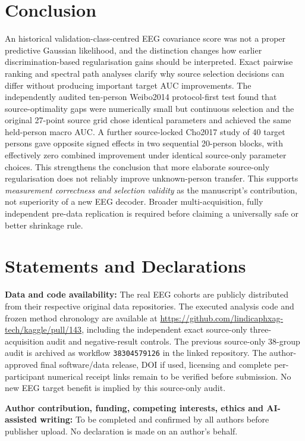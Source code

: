 \documentclass[12pt,a4paper]{article}
\begin{document}
\section{Conclusion}
An historical validation-class-centred EEG covariance score
was not a proper predictive Gaussian likelihood, and
the distinction changes how earlier discrimination-based
regularisation gains should be interpreted. Exact
pairwise ranking and spectral path analyses clarify why
source selection decisions can differ without producing
important target AUC improvements. The independently
audited ten-person Weibo2014 protocol-first test
found that source-optimality gaps were numerically
small but continuous selection and the original
27-point source grid chose identical parameters and
achieved the same held-person macro AUC.
A further source-locked Cho2017 study of 40 target persons
gave opposite signed effects in two sequential 20-person
blocks, with effectively zero combined improvement under
identical source-only parameter choices. This strengthens
the conclusion that more elaborate source-only regularisation
does not reliably improve unknown-person transfer.
This supports \emph{measurement correctness and
selection validity} as the manuscript's contribution,
not superiority of a new EEG decoder. Broader
multi-acquisition, fully independent pre-data
replication is required before claiming a universally
safe or better shrinkage rule.

\section*{Statements and Declarations}
\textbf{Data and code availability:} The real EEG cohorts
are publicly distributed from their respective original
data repositories. The executed analysis code and frozen
method chronology are available at
\url{https://github.com/lindicaphxag-tech/kaggle/pull/143},
including the independent exact source-only
three-acquisition audit and negative-result controls.
The previous source-only 38-group audit is archived as
workflow \texttt{38304579126} in the linked repository.
The author-approved final software/data release, DOI if
used, licensing and complete per-participant numerical
receipt links remain to be verified before submission.
No new EEG target benefit is implied by this source-only audit.

\textbf{Author contribution, funding, competing interests, ethics and
AI-assisted writing:} To be completed and confirmed by all authors before
publisher upload. No declaration is made on an author's behalf.



\end{document}
